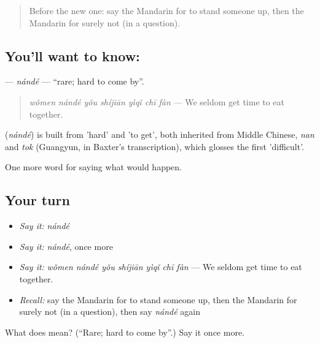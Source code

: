\label{lesson:ZH-C397-nande}



\begin{quote}
Before the new one: say the Mandarin for to stand someone up, then the Mandarin for surely not (in a question).
\end{quote}

\subsection*{You'll want to know: }
\textbf{} — \emph{nándé} — \textquotedblleft{}rare; hard to come by\textquotedblright{}.

\begin{quote}
\textbf{} \emph{wǒmen nándé yǒu shíjiān yìqǐ chī fàn} — We seldom get time to eat together.
\end{quote}

\begin{cousinweb}
\textbf{} (\emph{nándé}) is built from  'hard' and  'to get', both inherited from Middle Chinese, \emph{nan} and \emph{tok} (Guangyun, in Baxter's transcription), which glosses the first 'difficult'.
\end{cousinweb}

\begin{grammarlens}[title={What you've built}]
One more word for saying what would happen.
\end{grammarlens}

\subsection*{Your turn}
\begin{itemize}
\raggedright
  \item \emph{Say it:} \emph{nándé}
  \item \emph{Say it:} \emph{nándé}, once more
  \item \emph{Say it:} \emph{wǒmen nándé yǒu shíjiān yìqǐ chī fàn} — We seldom get time to eat together.
  \item \emph{Recall:} say the Mandarin for to stand someone up, then the Mandarin for surely not (in a question), then say \emph{nándé} again
\end{itemize}

\begin{tcolorbox}[breakable,colback=teal!4,colframe=teal!35!black,title={Before you move on}]
What does  mean? (\textquotedblleft{}Rare; hard to come by\textquotedblright{}.) Say it once more.
\end{tcolorbox}
